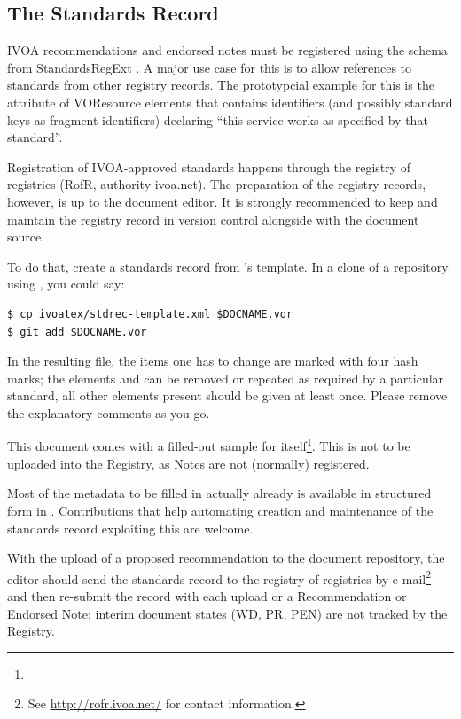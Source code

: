 \documentclass[11pt,a4paper]{ivoa}
\begin{document}
\subsection{The Standards Record}
\label{sect:stdrec}

IVOA recommendations and endorsed notes must be registered using the
schema from StandardsRegExt \citep{2012ivoa.spec.0508H}.  A major use
case for this is to allow references to standards from other registry
records. The prototypcial example for this is the 
attribute of VOResource  elements that contains
identifiers (and possibly standard keys as fragment identifiers)
declaring ``this service works as specified by that standard''.

Registration of IVOA-approved standards happens through the registry of
registries (RofR, authority ivoa.net).  The preparation of the registry
records, however, is up to the document editor.  It is strongly
recommended to keep and maintain the registry record in version control
alongside with the document source.

To do that, create a standards record from \ivoatex's template.  In a
clone of a repository using \ivoatex, you could say:

\begin{lstlisting}
$ cp ivoatex/stdrec-template.xml $DOCNAME.vor
$ git add $DOCNAME.vor
\end{lstlisting}

In the resulting file, the items one has to change are marked with four
hash marks; the elements  and  can be removed
or repeated as required by a particular standard, all other elements
present should be given at least once.  Please remove the explanatory
comments as you go. 

This document comes with a filled-out sample for
itself\footnote{}.  This is
not to be uploaded into the Registry, as Notes are not (normally)
registered.

Most of the metadata to be filled in actually already is available in
structured form in \ivoatex.  Contributions that help automating
creation and maintenance of the standards record exploiting this are welcome.

With the upload of a proposed recommendation to the document repository,
the editor should send the standards record to the registry of
registries by e-mail\footnote{See \url{http://rofr.ivoa.net/} for
contact information.} and then re-submit the record with each upload or
a Recommendation or Endorsed Note; interim document states (WD, PR, PEN)
are not tracked by the Registry.
\end{document}
